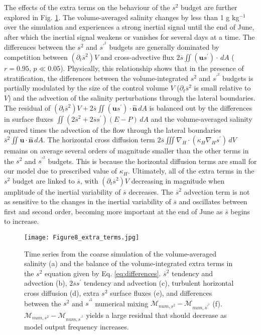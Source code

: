 \documentclass[draft]{agujournal2019}
\begin{document}
The effects of the extra terms on the behaviour of the $s^2$ budget are further explored in Fig. \ref{fig:s2_extra_terms}. The volume-averaged salinity changes by less than 1 g kg$^{-1}$ over the simulation and experiences a strong inertial signal until the end of June, after which the inertial signal weakens or vanishes for several days at a time. The differences between the $s^2$ and $s^{\prime^2}$ budgets are generally dominated by competition between $(\partial_t \overline{s}^2)V$ and cross-advective flux $2 \overline{s} \iint (\mathbf{u}s^\prime) \cdot \, dA$ ($r = 0.95$, $p \ll 0.05$). Physically, this relationship shows that in the presence of stratification, the differences between the volume-integrated $s^2$ and $s^{\prime^2}$ budgets is partially modulated by the size of the control volume $V$ ($\partial_t \overline{s}^2$ is small relative to $V$) and the advection of the salinity perturbations through the lateral boundaries. The residual of $(\partial_t \overline{s}^2)V+2 \overline{s} \iint (\mathbf{u}s^\prime) \cdot \hat{\mathbf{n}} \, dA$ is balanced out by the differences in surface fluxes $\iint (2 \overline{s}^2 + 2 \overline{s} s^\prime)(E-P) \, dA$ and the volume-averaged salinity squared times the advection of the flow through the lateral boundaries $\overline{s}^2 \iint \mathbf{u} \cdot \hat{\mathbf{n}} \, dA$. The horizontal cross diffusion term $2 \overline{s} \iiint \nabla_H \cdot (\kappa_H \nabla_H s^{\prime}) \, dV$ remains on average several orders of magnitude smaller than the other terms in the $s^2$ and $s^{\prime^2}$ budgets. This is because the horizontal diffusion terms are small for our model due to prescribed value of $\kappa_H$. Ultimately, all of the extra terms in the $s^2$ budget are linked to $\overline{s}$, with $(\partial_t \overline{s}^2)V$ decreasing in magnitude when amplitude of the inertial variability of $\overline{s}$ decreases. The $\overline{s}^2$ advection term is not as sensitive to the changes in the inertial variability of $\overline{s}$ and oscillates between first and second order, becoming more important at the end of June as $\overline{s}$ begins to increase.

\begin{figure}
 \centerline{\texttt{[image: Figure8\_extra\_terms.jpg]}}
  \caption{Time series from the coarse simulation of the volume-averaged salinity (a) and the balance of the volume-integrated extra terms in the $s^2$ equation given by Eq. \ref{eq:differences}. $\overline{s}^2$ tendency and advection (b), $2 \overline{s} s^\prime$ tendency and advection (c), turbulent horizontal cross diffusion (d), extra $s^2$ surface fluxes (e), and differences between the $s^2$ and $s^{\prime^2}$ numerical mixing $\mathcal{M}_{num, s^2}-\mathcal{M}_{num, s^{\prime^2}}$ (f). $\mathcal{M}_{num, s^2}-\mathcal{M}_{num, s^{\prime^2}}$ yields a large residual that should decrease as model output frequency increases.}
  \label{fig:s2_extra_terms}
\end{figure}
\end{document}
